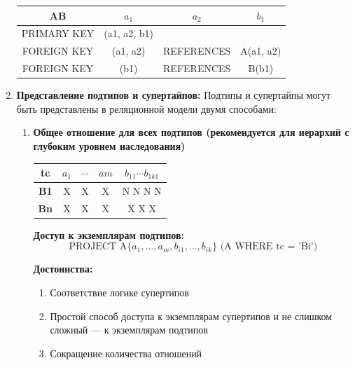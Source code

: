 \documentclass[a4paper,12pt]{article}
\begin{document}
\begin{enumerate}
\begin{center}
        \quad
        
        \begin{tabular}{|c|c|c|c|}
            \hline
            \textbf{AB} & $a_1$ & $a_2$ & $b_1$ \\
            \hline
            PRIMARY KEY & (a1, a2, b1) &  &  \\
            \hline
            FOREIGN KEY & (a1, a2) & REFERENCES & A(a1, a2) \\
            \hline
            FOREIGN KEY & (b1) & REFERENCES & B(b1) \\
            \hline
        \end{tabular}
    \end{center}
    
    \item \textbf{Представление подтипов и супертайпов:} Подтипы и супертайпы могут быть представлены в реляционной модели двумя способами:
    
    \begin{enumerate}[label=6\alph*.]
        \item \textbf{Общее отношение для всех подтипов (рекомендуется для иерархий с глубоким уровнем наследования)}
        
        \begin{center}
            \begin{tabular}{|c|c|c|c|c|}
                \hline
                \textbf{tc} & $a_1$ & $\cdots$ & $am$ & $b_{11} \cdots b_{1k1}$ \\
                \hline
                \textbf{B1} & X & X & X & N N N N \\
                \hline
                \textbf{Bn} & X & X & X & X X X \\
                \hline
            \end{tabular}
        \end{center}
        
        \textbf{Доступ к экземплярам подтипов:}
        \[
        \text{PROJECT A} \{a_1, \ldots, a_m, b_{i1}, \ldots, b_{ik}\} \text{ (A WHERE tc = 'Bi')}
        \]
        
        \textbf{Достоинства:}
        \begin{enumerate}
            \item Соответствие логике супертипов
            \item Простой способ доступа к экземплярам супертипов и не слишком сложный — к экземплярам подтипов
            \item Сокращение количества отношений
        \end{enumerate}
        

\end{enumerate}
\end{enumerate}
\end{document}
